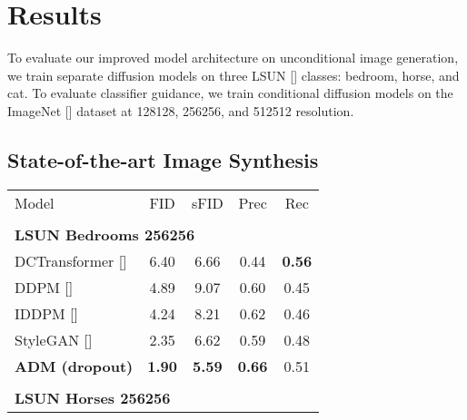 \documentclass{article}
\newcommand{\shortcite}[1]{[\citenum{#1}]}
\newcommand{\ablaname}{ADM}
\begin{document}
\section{Results}
\label{sec:results}
To evaluate our improved model architecture on unconditional image generation, we train separate diffusion models on three LSUN \shortcite{lsun} classes: bedroom, horse, and cat. To evaluate classifier guidance, we train conditional diffusion models on the ImageNet \shortcite{imagenet} dataset at 128128, 256256, and 512512 resolution.


\subsection{State-of-the-art Image Synthesis}

\begin{table}[t]
    \setlength\tabcolsep{4pt}
    \begin{center}
    \begin{small}
    \begin{subtable}[t]{.5\linewidth}
    \begin{tabular}[t]{lcccc}
    \toprule
    Model            & FID          & sFID       & Prec      & Rec \\
    \\
    \multicolumn{5}{l}{\bf{LSUN Bedrooms} 256256} \\
    \toprule
    
    DCTransformer \shortcite{dctransformer}    & 6.40          & 6.66      & 0.44      & \bf{0.56} \\
    DDPM \shortcite{ddpm} & 4.89 & 9.07 & 0.60 & 0.45 \\
    IDDPM \shortcite{improved}            & 4.24             & 8.21      & 0.62    & 0.46 \\
    StyleGAN \shortcite{stylegan}         & 2.35	         & 6.62      & 0.59      & 0.48 \\
    \bf{\ablaname{} (dropout)}   & \bf{1.90}          & \bf{5.59}      & \bf{0.66}      & 0.51 \\
    
    \\
    \multicolumn{5}{l}{\bf{LSUN Horses} 256256} \\
    \toprule
    

\end{tabular}
\end{subtable}
\end{small}
\end{center}
\end{table}
\end{document}
